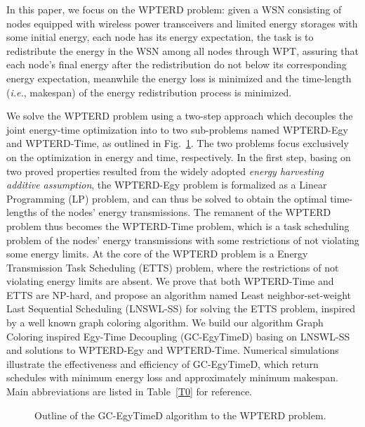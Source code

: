 \documentclass[journal,10pt]{IEEEtran}
\begin{document}
In this paper, we focus on the WPTERD problem: given a WSN consisting of nodes equipped with wireless power transceivers and limited energy storages with some initial energy, each node has its energy expectation, the task is to redistribute the energy in the WSN among all nodes through WPT, assuring that each node's final energy after the redistribution do not below its corresponding energy expectation, meanwhile the energy loss is minimized and the time-length (\textit{i.e.}, makespan) of the energy redistribution process is minimized.


We solve the WPTERD problem using a two-step approach which decouples the joint energy-time optimization into to two sub-problems named WPTERD-Egy and WPTERD-Time, as outlined in Fig.~\ref{fig_outline}. The two problems focus exclusively on the optimization in energy and time, respectively. In the first step, basing on two proved properties resulted from the widely adopted \textit{energy harvesting additive assumption}, the WPTERD-Egy problem is formalized as a Linear Programming (LP) problem, and can thus be solved to obtain the optimal time-lengths of the nodes' energy transmissions. The remanent of the WPTERD problem thus becomes the WPTERD-Time problem, which is a task scheduling problem of the nodes' energy transmissions with some restrictions of not violating some energy limits. At the core of the WPTERD problem is a Energy Transmission Task Scheduling (ETTS) problem, where the restrictions of not violating energy limits are absent. We prove that both WPTERD-Time and ETTS are NP-hard, and propose an algorithm named Least neighbor-set-weight Last Sequential Scheduling (LNSWL-SS) for solving the ETTS problem, inspired by a well known graph coloring algorithm. We build our algorithm Graph Coloring inspired Egy-Time Decoupling (GC-EgyTimeD) basing on LNSWL-SS and solutions to WPTERD-Egy and WPTERD-Time. Numerical simulations illustrate the effectiveness and efficiency of GC-EgyTimeD, which return schedules with minimum energy loss and approximately minimum makespan. Main abbreviations are listed in Table~\ref{T0} for reference.

\begin{figure}[htb]
\caption{Outline of the GC-EgyTimeD algorithm to the WPTERD problem.}
\label{fig_outline}
\end{figure}
\end{document}
